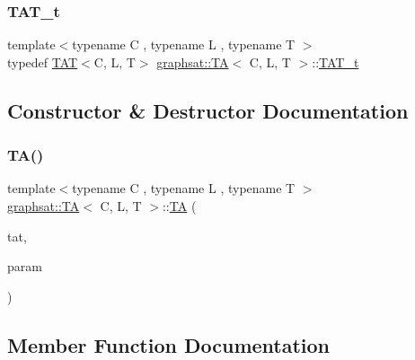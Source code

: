\mbox{\label{classgraphsat_1_1_t_a_a9d81348f6a488c20a885e5eed6cd8a14}} 
\subsubsection{\texorpdfstring{TAT\_t}{TAT\_t}}
{\footnotesize\ttfamily template$<$typename C , typename L , typename T $>$ \\
typedef \mbox{\hyperlink{classgraphsat_1_1_t_a_t}{T\+AT}}$<$C, L, T$>$ \mbox{\hyperlink{classgraphsat_1_1_t_a}{graphsat\+::\+TA}}$<$ C, L, T $>$\+::\mbox{\hyperlink{classgraphsat_1_1_t_a_a9d81348f6a488c20a885e5eed6cd8a14}{T\+A\+T\+\_\+t}}\hspace{0.3cm}{\ttfamily [private]}}



\subsection{Constructor \& Destructor Documentation}
\mbox{\label{classgraphsat_1_1_t_a_a52ab20ea442cfeae66efc7aafdbd5e3e}} 
\subsubsection{\texorpdfstring{TA()}{TA()}}
{\footnotesize\ttfamily template$<$typename C , typename L , typename T $>$ \\
\mbox{\hyperlink{classgraphsat_1_1_t_a}{graphsat\+::\+TA}}$<$ C, L, T $>$\+::\mbox{\hyperlink{classgraphsat_1_1_t_a}{TA}} (\begin{DoxyParamCaption}\item[{const \mbox{\hyperlink{classgraphsat_1_1_t_a_a9d81348f6a488c20a885e5eed6cd8a14}{T\+A\+T\+\_\+t}} $\ast$}]{tat,  }\item[{const \mbox{\hyperlink{classgraphsat_1_1_parameter}{Parameter}} \&}]{param }\end{DoxyParamCaption})\hspace{0.3cm}{\ttfamily [inline]}}



\subsection{Member Function Documentation}
\mbox{\label{classgraphsat_1_1_t_a_a9bbe8918a388658c5ee6c5fde5325a07}} 
